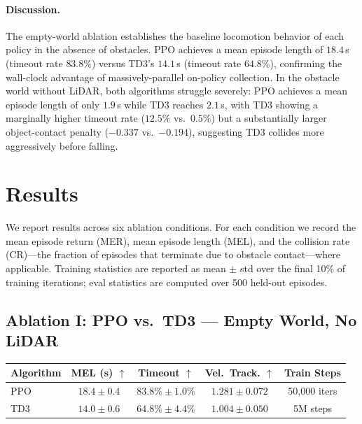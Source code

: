 \documentclass{article}
\begin{document}
  \paragraph{Discussion.}
  The empty-world ablation establishes the baseline locomotion behavior of each policy in the
  absence of obstacles.
  PPO achieves a mean episode length of $18.4$\,s (timeout rate $83.8\%$) versus TD3's $14.1$\,s
  (timeout rate $64.8\%$), confirming the wall-clock advantage of massively-parallel on-policy
  collection.
  In the obstacle world without LiDAR, both algorithms struggle severely: PPO achieves a mean
  episode length of only $1.9$\,s while TD3 reaches $2.1$\,s, with TD3 showing a marginally higher
  timeout rate ($12.5\%$ vs.\ $0.5\%$) but a substantially larger object-contact penalty
  ($-0.337$ vs.\ $-0.194$), suggesting TD3 collides more aggressively before falling.


\section{Results}

We report results across six ablation conditions.
For each condition we record the mean episode return (MER), mean episode
length (MEL), and the collision rate (CR)—the fraction of episodes that
terminate due to obstacle contact—where applicable.
Training statistics are reported as mean $\pm$ std over the final 10\% of
training iterations; eval statistics are computed over 500 held-out episodes.

\subsection{Ablation I: PPO vs.\ TD3 — Empty World, No LiDAR}

\begin{center}
\begin{tabular}{lcccc}
  \toprule
  \textbf{Algorithm} & \textbf{MEL (s)} $\uparrow$ & \textbf{Timeout} $\uparrow$
    & \textbf{Vel.\ Track.} $\uparrow$ & \textbf{Train Steps} \\
  \midrule
  PPO & $18.4 \pm 0.4$ & $83.8\% \pm 1.0\%$ & $1.281 \pm 0.072$ & 50{,}000 iters \\
  TD3 & $14.0 \pm 0.6$ & $64.8\% \pm 4.4\%$ & $1.004 \pm 0.050$ & 5M steps \\
  \bottomrule
\end{tabular}
\end{center}
\end{document}
